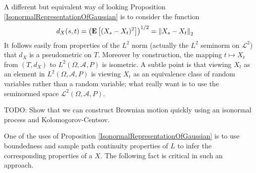 A different but equivalent way of looking Proposition \ref{IsonormalRepresentationOfGaussian} is to consider the function 
\begin{align*}
d_X(s,t) &= \left( \textbf{E}\left[(X_s - X_t)^2\right] \right)^{1/2} = \left \lVert X_s - X_t \right \rVert_2
\end{align*}
It follows easily from properties of the $L^2$ norm (actually the $L^2$ seminorm on $\mathcal{L}^2$) that $d_X$ is a pseudometric on $T$.  Moreover by construction, the mapping $t \mapsto X_t$ from $(T,d_X)$ to $L^2(\Omega, \mathcal{A}, P)$ is isometric.  A subtle point is that viewing $X_t$ as an element in $L^2(\Omega, \mathcal{A}, P)$ is viewing $X_t$ as an equivalence class of random variables rather than a random variable; what really want is to use the seminormed space $\mathcal{L}^2(\Omega, \mathcal{A}, P)$.

TODO: Show that we can construct Brownian motion quickly using an
isonormal process and Kolomogorov-Centsov.

One of the uses of Proposition \ref{IsonormalRepresentationOfGaussian} is to use boundedness and sample path continuity properties of $L$ to infer the corresponding properties of a $X$.  The following fact is critical in such an approach.

